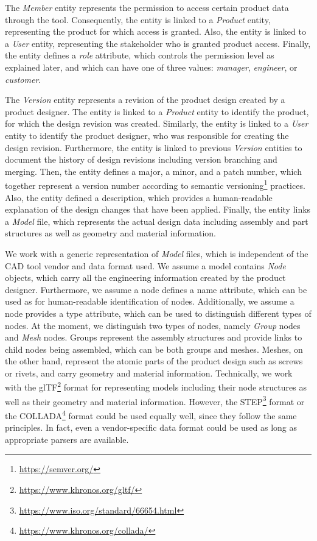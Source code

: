     The \textit{Member} entity represents the permission to access certain product data through the tool.
    Consequently, the entity is linked to a \textit{Product} entity, representing the product for which access is granted.
    Also, the entity is linked to a \textit{User} entity, representing the stakeholder who is granted product access.
    Finally, the entity defines a \textit{role} attribute, which controls the permission level as explained later, and which can have one of three values: \textit{manager}, \textit{engineer}, or \textit{customer}.

    The \textit{Version} entity represents a revision of the product design created by a product designer.
    The entity is linked to a \textit{Product} entity to identify the product, for which the design revision was created.
    Similarly, the entity is linked to a \textit{User} entity to identify the product designer, who was responsible for creating the design revision.
    Furthermore, the entity is linked to previous \textit{Version} entities to document the history of design revisions including version branching and merging.
    Then, the entity defines a major, a minor, and a patch number, which together represent a version number according to semantic versioning\footnote{\url{https://semver.org/}} practices.
    Also, the entity defined a description, which provides a human-readable explanation of the design changes that have been applied.
    Finally, the entity links a \textit{Model} file, which represents the actual design data including assembly and part structures as well as geometry and material information.
    
    We work with a generic representation of \textit{Model} files, which is independent of the CAD tool vendor and data format used.
    We assume a model contains \textit{Node} objects, which carry all the engineering information created by the product designer.
    Furthermore, we assume a node defines a name attribute, which can be used as for human-readable identification of nodes.
    Additionally, we assume a node provides a type attribute, which can be used to distinguish different types of nodes.
    At the moment, we distinguish two types of nodes, namely \textit{Group} nodes and \textit{Mesh} nodes.
    Groups represent the assembly structures and provide links to child nodes being assembled, which can be both groups and meshes.
    Meshes, on the other hand, represent the atomic parts of the product design such as screws or rivets, and carry geometry and material information.
    Technically, we work with the glTF\footnote{\url{https://www.khronos.org/gltf/}} format for representing models including their node structures as well as their geometry and material information.
    However, the STEP\footnote{\url{https://www.iso.org/standard/66654.html}} format or the COLLADA\footnote{\url{https://www.khronos.org/collada/}} format could be used equally well, since they follow the same principles.
    In fact, even a vendor-specific data format could be used as long as appropriate parsers are available.

